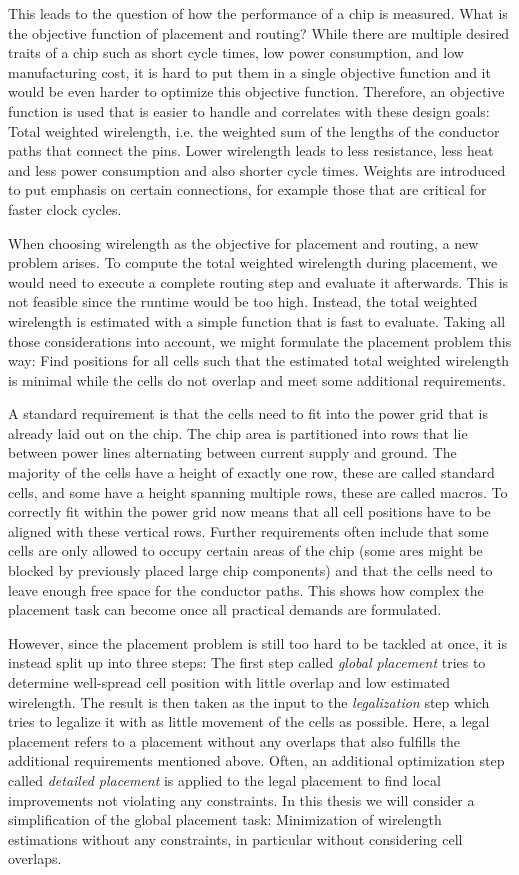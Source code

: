 This leads to the question of how the performance of a chip is measured. 
What is the objective function of placement and routing?
While there are multiple desired traits of a chip such as short cycle times, low power consumption, and low manufacturing cost, 
it is hard to put them in a single objective function and it would be even harder to optimize this objective function.
Therefore, an objective function is used that is easier to handle and correlates with these design goals: 
Total weighted wirelength, i.e. the weighted sum of the lengths of the conductor paths that connect the pins.
Lower wirelength leads to less resistance, less heat and less power consumption and also shorter cycle times.
Weights are introduced to put emphasis on certain connections, for example those that are critical for faster clock cycles.

When choosing wirelength as the objective for placement and routing, a new problem arises.
To compute the total weighted wirelength during placement, we would need to execute a complete routing step and evaluate it afterwards.
This is not feasible since the runtime would be too high.
Instead, the total weighted wirelength is estimated with a simple function that is fast to evaluate.
Taking all those considerations into account, we might formulate the placement problem this way:
Find positions for all cells such that the estimated total weighted wirelength is minimal while the cells do not overlap and meet some additional requirements.

A standard requirement is that the cells need to fit into the power grid that is already laid out on the chip.
The chip area is partitioned into rows that lie between power lines alternating between current supply and ground.
The majority of the cells have a height of exactly one row, these are called standard cells, and some have a height spanning multiple rows, these are called macros.
To correctly fit within the power grid now means that all cell positions have to be aligned with these vertical rows.
Further requirements often include that some cells are only allowed to occupy certain areas of the chip
(some ares might be blocked by previously placed large chip components)
and that the cells need to leave enough free space for the conductor paths.
This shows how complex the placement task can become once all practical demands are formulated.

However, since the placement problem is still too hard to be tackled at once, it is instead split up into three steps:
The first step called \emph{global placement} tries to determine well-spread cell position with little overlap and low estimated wirelength.
The result is then taken as the input to the \emph{legalization} step which tries to legalize it with as little movement of the cells as possible.
Here, a legal placement refers to a placement without any overlaps that also fulfills the additional requirements mentioned above.
Often, an additional optimization step called \emph{detailed placement} is applied to the legal placement to find local improvements not violating any constraints.
In this thesis we will consider a simplification of the global placement task:
Minimization of wirelength estimations without any constraints, in particular without considering cell overlaps.

